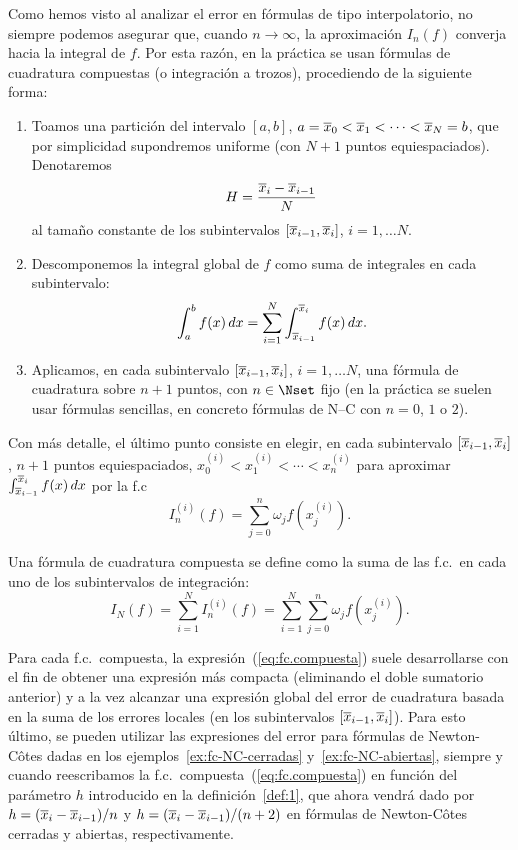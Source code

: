 Como hemos visto al analizar el error en fórmulas de tipo
interpolatorio, no siempre podemos asegurar que, cuando $n\to\infty$,
la aproximación $I_n(f)$ converja hacia la integral de $f$. Por esta
razón, en la práctica se usan fórmulas de cuadratura compuestas (o
integración a trozos), procediendo de la siguiente forma:
\begin{enumerate}
\item Toamos una partición del intervalo $[a,b]$,
  $a=\overline x_0<\overline x_1<\dots<\overline x_N=b$, que por simplicidad supondremos
  uniforme (con $N+1$ puntos equiespaciados). Denotaremos
  $$
  H=\frac{\overline x_{i}-\overline x_{i-1}}N
  $$
  al tamaño constante de los subintervalos $[\overline x_{i-1},\overline x_i]$, $i=1,\dots N$.
\item Descomponemos la integral global de $f$ como suma de integrales
  en cada subintervalo:
  \begin{equation*}
    \int_a^b f(x)\,dx = \sum_{i=1}^N \int_{\overline x_{i-1}}^{\overline x_i}f(x)\,dx.
  \end{equation*}
\item Aplicamos, en cada subintervalo $[\overline x_{i-1},\overline x_i]$,
  $i=1,\dots N$, una fórmula de cuadratura sobre $n+1$ puntos, con
  $n\in\Nset$ fijo (en la práctica se suelen usar fórmulas sencillas,
  en concreto fórmulas de N--C con $n=0$, $1$ o $2$).
\end{enumerate}
Con más detalle, el último punto consiste en elegir, en cada
subintervalo $[\overline x_{i-1},\overline x_i]$, $n+1$ puntos equiespaciados,
$x_0^{(i)}<x_1^{(i)}<\cdots<x_n^{(i)}$ para aproximar
$\int_{\overline x_{i-1}}^{\overline x_i}f(x)\,dx$ por la f.c
\begin{equation}
  \label{eq:fc.compuesta.en.un.intervalo}
  I_n^{(i)}(f)=\sum_{j=0}^n \omega_j f(x_j^{(i)}).
\end{equation}
\begin{definition}
  Una fórmula de cuadratura compuesta se define como la suma de las
  f.c.\ en cada uno de los subintervalos de integración:
  \begin{equation}
    I_N(f)=\sum_{i=1}^N I_n^{(i)}(f)  =\sum_{i=1}^N \sum_{j=0}^n \omega_j f(x_j^{(i)}).
  \label{eq:fc.compuesta}
  \end{equation}
  \label{def:fc.compuesta}
\end{definition}

Para cada f.c.\ compuesta, la expresión~(\ref{eq:fc.compuesta}) suele
desarrollarse con el fin de obtener una expresión más compacta
(eliminando el doble sumatorio anterior) y a la vez alcanzar una
expresión global del error de cuadratura basada en la suma de los
errores locales (en los subintervalos $[\overline x_{i-1},\overline x_i]$). Para esto
último, se pueden utilizar las expresiones del error para fórmulas de
Newton-Côtes dadas en los ejemplos~\ref{ex:fc-NC-cerradas}
y~\ref{ex:fc-NC-abiertas}, siempre y cuando reescribamos la f.c.\
compuesta~(\ref{eq:fc.compuesta}) en función del parámetro $h$
introducido en la definición~\ref{def:1}, que ahora vendrá dado por
$h=(\overline x_i-\overline x_{i-1})/n$ y $h=(\overline x_i-\overline x_{i-1})/(n+2)$ en fórmulas de
Newton-Côtes cerradas y abiertas, respectivamente.



